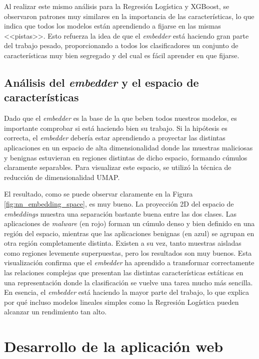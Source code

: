 Al realizar este mismo análisis para la Regresión Logística y XGBoost, se observaron patrones muy similares en la importancia de las características, lo que indica que todos los modelos están aprendiendo a fijarse en las mismas <<pistas>>. Esto refuerza la idea de que el \textit{embedder} está haciendo gran parte del trabajo pesado, proporcionando a todos los clasificadores un conjunto de características muy bien segregado y del cual es fácil aprender en que fijarse.

\subsection{Análisis del \textit{embedder} y el espacio de características}

Dado que el \textit{embedder} es la base de la que beben todos nuestros modelos, es importante comprobar si está haciendo bien su trabajo. Si la hipótesis es correcta, el \textit{embedder} debería estar aprendiendo a proyectar las distintas aplicaciones en un espacio de alta dimensionalidad donde las muestras maliciosas y benignas estuvieran en regiones distintas de dicho espacio, formando cúmulos claramente separables. Para visualizar este espacio, se utilizó la técnica de reducción de dimensionalidad UMAP.


El resultado, como se puede observar claramente en la Figura \ref{fig:nn_embedding_space}, es muy bueno. La proyección 2D del espacio de \textit{embeddings} muestra una separación bastante buena entre las dos clases. Las aplicaciones de \textit{malware} (en rojo) forman un cúmulo denso y bien definido en una región del espacio, mientras que las aplicaciones benignas (en azul) se agrupan en otra región completamente distinta. Existen a su vez, tanto muestras aisladas como regiones levemente superpuestas, pero los resultados son muy buenos. Esta visualización confirma que el \textit{embedder} ha aprendido a transformar correctamente las relaciones complejas que presentan las distintas características estáticas en una representación donde la clasificación se vuelve una tarea mucho más sencilla. En esencia, el \textit{embedder} está haciendo la mayor parte del trabajo, lo que explica por qué incluso modelos lineales simples como la Regresión Logística pueden alcanzar un rendimiento tan alto.

\section{Desarrollo de la aplicación web}

